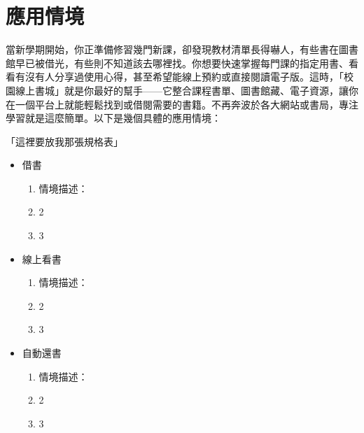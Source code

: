 \chapter{應用情境}

\hspace{2em}當新學期開始，你正準備修習幾門新課，卻發現教材清單長得嚇人，有些書在圖書館早已被借光，有些則不知道該去哪裡找。你想要快速掌握每門課的指定用書、看看有沒有人分享過使用心得，甚至希望能線上預約或直接閱讀電子版。這時，「校園線上書城」就是你最好的幫手——它整合課程書單、圖書館藏、電子資源，讓你在一個平台上就能輕鬆找到或借閱需要的書籍。不再奔波於各大網站或書局，專注學習就是這麼簡單。以下是幾個具體的應用情境：

「這裡要放我那張規格表」

\begin{itemize}
    \item 借書
        \begin{enumerate}
            \item 情境描述：
            \item 2
            \item 3
        \end{enumerate}
        
    \item 線上看書
        \begin{enumerate}
            \item 情境描述：
            \item 2
            \item 3
        \end{enumerate}
         
    \item 自動還書
        \begin{enumerate}
            \item 情境描述：
            \item 2
            \item 3
        \end{enumerate}
    
\end{itemize}